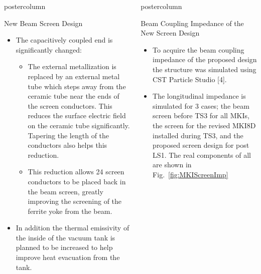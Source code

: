 \documentclass[final,hyperref={pdfpagelabels=false}]{beamer}
\newlength{\columnheight}
\begin{document}
\begin{frame}
\begin{columns}
\begin{column}{.49\textwidth}
\begin{beamercolorbox}[center,wd=\textwidth]{postercolumn}
\begin{minipage}[T]{.95\textwidth}
{\begin{block}{New Beam Screen Design}
{\begin{itemize}
\item{The capacitively coupled end is significantly changed:}
\begin{itemize}
\item{The external metallization is replaced by an external metal tube which steps away from the ceramic tube near the ends of the screen conductors. This reduces the surface electric field on the ceramic tube significantly. Tapering the length of the conductors also helps this reduction.}
\item{This reduction allows 24 screen conductors to be placed back in the beam screen, greatly improving the screening of the ferrite yoke from the beam.}
\end{itemize}
\item{In addition the thermal emissivity of the inside of the vacuum tank is planned to be increased to help improve heat evacuation from the tank.}
\end{itemize}
}
\end{block}
            \vfill


           \vfill
         \vfill
          }
        \end{minipage}
      \end{beamercolorbox}
    \end{column}

    \begin{column}{.49\textwidth}
      \begin{beamercolorbox}[center,wd=\textwidth]{postercolumn}
        \begin{minipage}[T]{.95\textwidth} %
          \parbox[t][\columnheight]{\textwidth}{ %

\vfill

\begin{block}{Beam Coupling Impedance of the New Screen Design}
\small{
\begin{itemize}
\item{To acquire the beam coupling impedance of the proposed design the structure was simulated using CST Particle Studio [4].}
\item{The longitudinal impedance is simulated for 3 cases; the beam screen before TS3 for all MKIs, the screen for the revised MKI8D installed during TS3, and the proposed screen design for post LS1. The real components of all are shown in Fig.~\ref{fig:MKIScreenImp}}


\end{itemize}}
\end{block}}
\end{minipage}
\end{beamercolorbox}
\end{column}
\end{columns}
\end{frame}
\end{document}
